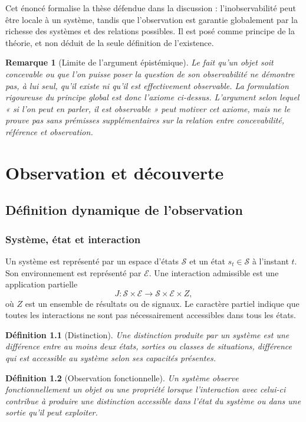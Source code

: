 \documentclass[11pt,a4paper,openany]{book}
\newtheorem{definition}{Définition}[chapter]
\newtheorem{remark}[definition]{Remarque}
\newcommand{\Syst}{\mathcal S}
\newcommand{\Env}{\mathcal E}
\begin{document}
Cet énoncé formalise la thèse défendue dans la discussion : l'inobservabilité peut être locale à un système, tandis que l'observation est garantie globalement par la richesse des systèmes et des relations possibles. Il est posé comme principe de la théorie, et non déduit de la seule définition de l'existence.

\begin{remark}[Limite de l'argument épistémique]
Le fait qu'un objet soit concevable ou que l'on puisse poser la question de son observabilité ne démontre pas, à lui seul, qu'il existe ni qu'il est effectivement observable. La formulation rigoureuse du principe global est donc l'axiome ci-dessus. L'argument selon lequel « si l'on peut en parler, il est observable » peut motiver cet axiome, mais ne le prouve pas sans prémisses supplémentaires sur la relation entre concevabilité, référence et observation.
\end{remark}

\part{Observation et découverte}
\chapter{Définition dynamique de l'observation}

\section{Système, état et interaction}
Un système est représenté par un espace d'états $\Syst$ et un état $s_t\in\Syst$ à l'instant $t$. Son environnement est représenté par $\Env$. Une interaction admissible est une application partielle
\[
J:\Syst\times\Env\longrightarrow \Syst\times\Env\times Z,
\]
où $Z$ est un ensemble de résultats ou de signaux. Le caractère partiel indique que toutes les interactions ne sont pas nécessairement accessibles dans tous les états.

\begin{definition}[Distinction]
Une distinction produite par un système est une différence entre au moins deux états, sorties ou classes de situations, différence qui est accessible au système selon ses capacités présentes.
\end{definition}

\begin{definition}[Observation fonctionnelle]
Un système observe fonctionnellement un objet ou une propriété lorsque l'interaction avec celui-ci contribue à produire une distinction accessible dans l'état du système ou dans une sortie qu'il peut exploiter.
\end{definition}
\end{document}
